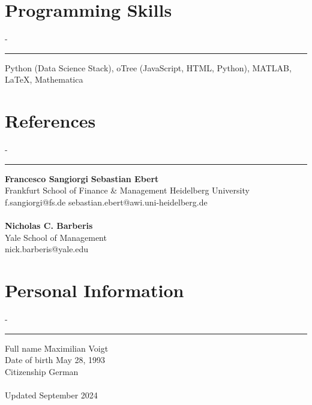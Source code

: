 \documentclass{res}
\newcommand{\sectionline}{	\vspace{-8pt}
	{\parindent-\sectionwidth \rule{\resumewidth}{0.4pt}} }
\newenvironment{nstabbing}
  {\setlength{\topsep}{-\parskip}%
   \setlength{\partopsep}{0pt}%
   \tabbing}
  {\endtabbing}
\begin{document}
\begin{resume}
\section{Programming Skills}
	\sectionline
	\vspace{-3ex}
	\begin{nstabbing}
	Python (Data Science Stack), oTree (JavaScript, HTML, Python), MATLAB, \LaTeX, Mathematica
	\end{nstabbing}

\section{References}
	\sectionline
	\vspace{-3ex}
	\begin{nstabbing}
		\textbf{Francesco Sangiorgi} \hspace{12em} \= \textbf{Sebastian Ebert} \\
		Frankfurt School of Finance \& Management \> Heidelberg University \\
		f.sangiorgi@fs.de \> sebastian.ebert@awi.uni-heidelberg.de  \\
		\\
		\textbf{Nicholas C. Barberis}  \\
		Yale School of Management  \\
		nick.barberis@yale.edu
	\end{nstabbing}

\section{Personal Information}
	\sectionline
	\vspace{-3ex}
	\begin{nstabbing}
		Full name \qquad \= Maximilian Voigt \\
		Date of birth  \> May 28, 1993 \\
		Citizenship  \> German \\
		\\
		Updated \> September 2024
	\end{nstabbing} 

\end{resume}
\end{document}
